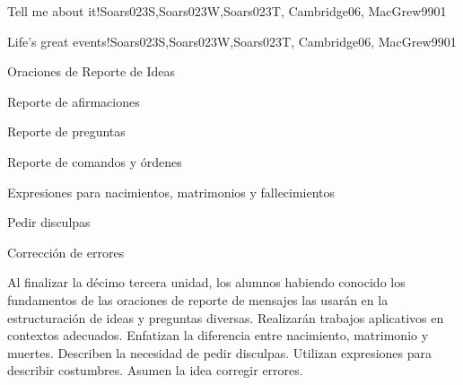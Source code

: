 \begin{syllabus}
\begin{unit}{Tell me about it!}{Soars023S,Soars023W,Soars023T, Cambridge06, MacGrew99}{0}{1}
\end{unit}

\begin{unit}{Life's great events!}{Soars023S,Soars023W,Soars023T, Cambridge06, MacGrew99}{0}{1}
   \begin{topics}
      \item Oraciones de Reporte de Ideas
      \item Reporte de afirmaciones
      \item Reporte de preguntas
      \item Reporte de comandos y órdenes
      \item Expresiones para nacimientos, matrimonios y fallecimientos
      \item Pedir disculpas
      \item Corrección de errores
   \end{topics}

   \begin{learningoutcomes}
      \item Al finalizar la décimo tercera unidad, los alumnos habiendo conocido los fundamentos de las oraciones de reporte de mensajes las usarán en la estructuración de ideas y preguntas diversas. Realizarán trabajos aplicativos en contextos adecuados. Enfatizan la diferencia entre nacimiento, matrimonio y muertes. Describen la necesidad de pedir disculpas. Utilizan expresiones para describir costumbres. Asumen la idea corregir errores.
   \end{learningoutcomes}
\end{unit}

\begin{coursebibliography}
\end{coursebibliography}
\end{syllabus}
%

